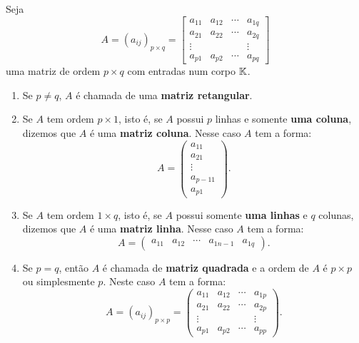 \begin{definicao}
	Seja
	\[
		A = (a_{ij})_{p\times q} = \begin{bmatrix}
			a_{11} & a_{12} & \cdots & a_{1q}\\
			a_{21} & a_{22} & \cdots & a_{2q}\\
			\vdots & & & \vdots\\
			a_{p1} & a_{p2} & \cdots & a_{pq}
		\end{bmatrix}
	\]
	uma matriz de ordem $p\times q$ com entradas num corpo $\mathbb{K}$.

	\begin{enumerate}
		\item Se $p \ne q$, $A$ é chamada de uma \textbf{matriz retangular}.

		\item Se $A$ tem ordem $p \times 1$, isto é, se $A$ possui $p$ linhas e somente \textbf{uma coluna}, dizemos que $A$ é uma \textbf{matriz coluna}. Nesse caso $A$ tem a forma:
		\[
			A = \begin{pmatrix}a_{11}\\a_{21}\\\vdots\\a_{p - 11}\\a_{p1}\end{pmatrix}.
		\]
		\item Se $A$ tem ordem $1 \times q$, isto é, se $A$ possui somente \textbf{uma linhas} e $q$ colunas, dizemos que $A$ é uma \textbf{matriz linha}. Nesse caso $A$ tem a forma:
		\[
			A = \begin{pmatrix}a_{11} & a_{12} & \cdots & a_{1n-1} & a_{1q}\end{pmatrix}.
		\]
		\item Se $p = q$, então $A$ é chamada de \textbf{matriz quadrada} e a ordem de $A$ é $p \times p$ ou simplesmente $p$. Neste caso $A$ tem a forma:
		\[
			A = (a_{ij})_{p\times p} = \begin{pmatrix}
				a_{11} & a_{12} & \cdots & a_{1p}\\
				a_{21} & a_{22} & \cdots & a_{2p}\\
				\vdots & & & \vdots\\
				a_{p1} & a_{p2} & \cdots & a_{pp}
			\end{pmatrix}.
		\]
	\end{enumerate}
\end{definicao}

